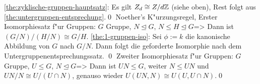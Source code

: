 \proof \ref{the:zyklische-gruppen-hauptsatz}:{
  Es gilt $Z_d\cong Z/d\mathbb Z$ (siehe oben), 
  Rest folgt aus \ref{the:untergruppen-entsprechung}.\qed
  }
\theorem Noether's K"urzungsregel, Erster Isomorphiesatz f"ur Gruppen:
  $G$ Gruppe, $N\unlhd G$, $N\leq H\unlhd G$=>{
  \label{the:1-gruppen-iso}
  Dann ist $(G/N)/(H/N)\cong G/H$.
  }
\proof \ref{the:1-gruppen-iso}:{
  Sei $\phi:=k$ die kanonische Abbildung von $G$ nach $G/N$. Dann folgt
  die geforderte Isomorphie nach dem Untergruppenentsprechungssatz.
  \qed
  }
\theorem Zweiter Isomorphiesatz f"ur Gruppen:
  $G$ Gruppe, $U\leq G$, $N\unlhd G$=>{
  \label{the:2-gruppen-iso}
  Dann ist $UN\leq G$, weiter $N\leq UN$ und $UN/N\cong U/(U\cap N)$, genauso wieder
  $U(UN,N)\cong U(U,U\cap N)$.\qed
  }
